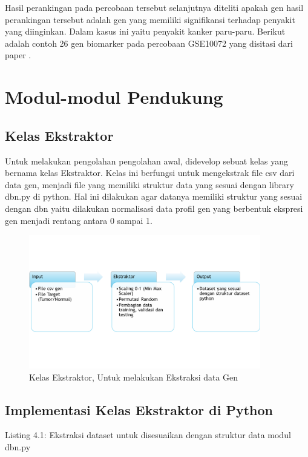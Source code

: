 Hasil perankingan pada percobaan tersebut selanjutnya diteliti apakah gen hasil perankingan tersebut adalah gen yang memiliki signifikansi terhadap penyakit yang diinginkan. Dalam kasus ini yaitu penyakit kanker paru-paru. Berikut adalah contoh 26 gen biomarker pada percobaan GSE10072 yang disitasi dari paper \citep{landi2008gene}. 

\section{Modul-modul Pendukung}
\subsection{Kelas Ekstraktor}
Untuk melakukan pengolahan pengolahan awal, didevelop sebuat kelas yang bernama kelas Ekstraktor. Kelas ini berfungsi untuk mengekstrak file csv dari data gen, menjadi file yang memiliki struktur data yang sesuai dengan library dbn.py di python. Hal ini dilakukan agar datanya memiliki struktur yang sesuai dengan dbn yaitu dilakukan normalisasi data profil gen yang berbentuk ekspresi gen menjadi rentang antara 0 sampai 1.

\begin{figure}
	\centering
	\includegraphics[width=0.9\textwidth]
		{pics/ekstraktor.png}
	\caption{Kelas Ekstraktor, Untuk melakukan Ekstraksi data Gen}
	\label{fig:preproses}
\end{figure}

\subsection{Implementasi Kelas Ekstraktor di Python}
Listing 4.1: Ekstraksi dataset untuk disesuaikan dengan struktur data modul dbn.py


